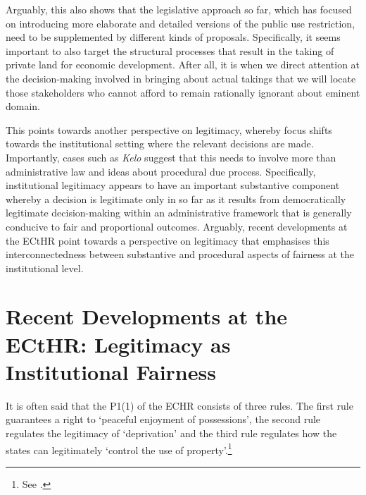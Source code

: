 Arguably, this also shows that the legislative approach so far, which has focused on introducing more elaborate and detailed versions of the public use restriction, need to be supplemented by different kinds of proposals. Specifically, it seems important to also target the structural processes that result in the taking of private land for economic development. After all, it is when we direct attention at the decision-making involved in bringing about actual takings that we will locate those stakeholders who cannot afford to remain rationally ignorant about eminent domain. %

This points towards another perspective on legitimacy, whereby focus shifts towards the institutional setting where the relevant decisions are made. Importantly, cases such as {\it Kelo} suggest that this needs to involve more than administrative law and ideas about procedural due process. Specifically, institutional legitimacy appears to have an important substantive component whereby a decision is legitimate only in so far as it results from democratically legitimate decision-making within an administrative framework that is generally conducive to fair and proportional outcomes. Arguably, recent developments at the ECtHR point towards a perspective on legitimacy that emphasises this interconnectedness between substantive and procedural aspects of fairness at the institutional level.

\section{Recent Developments at the ECtHR: Legitimacy as Institutional Fairness}\label{sec:3:4}

It is often said that the P1(1) of the ECHR consists of three rules. The first rule guarantees a right to `peaceful enjoyment of possessions', the second rule regulates the legitimacy of `deprivation' and the third rule regulates how the states can legitimately `control the use of property'.\footnote{See \cite[61]{sporrong82}.}

